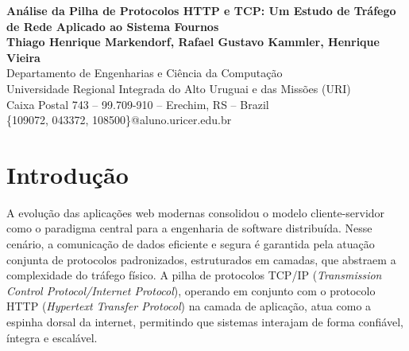 \documentclass[12pt, a4paper]{article}
\begin{document}
\begin{center}
  {\large\textbf{Análise da Pilha de Protocolos HTTP e TCP: Um Estudo de Tráfego de Rede Aplicado ao Sistema Fournos}}\\[0.5em]
  \textbf{Thiago Henrique Markendorf, Rafael Gustavo Kammler, Henrique Vieira}\\[0.3em]
  Departamento de Engenharias e Ciência da Computação\\
  Universidade Regional Integrada do Alto Uruguai e das Missões (URI)\\
  Caixa Postal 743 -- 99.709-910 -- Erechim, RS -- Brazil\\
  \{109072, 043372, 108500\}@aluno.uricer.edu.br
\end{center}

\vspace{1em}
\begin{abstract}
    Este artigo apresenta um estudo técnico sobre a comunicação de dados e o tráfego de rede aplicado ao projeto integrador Fournos, um sistema web de gerenciamento de pedidos para panificadoras. O objetivo principal do relatório é mapear o fluxo de informações através da pilha de protocolos TCP/IP, conectando conceitos teóricos da disciplina de redes de computadores à prática da engenharia de software. A análise abrange a atuação da Camada de Transporte, destacando o mecanismo de confiabilidade do protocolo TCP, e detalha a Camada de Aplicação, evidenciando o uso dos métodos HTTP e cabeçalhos para o tráfego de regras de negócio e controle de acesso (RBAC). Adicionalmente, o estudo explora o isolamento lógico provido por redes virtuais conteinerizadas (Docker) para a comunicação interna com o banco de dados PostgreSQL. Por fim, o trabalho propõe uma reflexão sobre eficiência de rede, comparando o alto custo de tráfego do atual modelo de \textit{HTTP Polling} com uma futura migração para o protocolo WebSocket. Conclui-se demonstrando a dependência intrínseca das aplicações \textit{full-stack} em relação aos protocolos de comunicação, evidenciando que a compreensão da infraestrutura de redes é fundamental para a viabilidade e evolução contínua do \textit{software}.
\end{abstract}

\section{Introdução}

A evolução das aplicações web modernas consolidou o modelo cliente-servidor como o paradigma central para a engenharia de software distribuída. Nesse cenário, a comunicação de dados eficiente e segura é garantida pela atuação conjunta de protocolos padronizados, estruturados em camadas, que abstraem a complexidade do tráfego físico. A pilha de protocolos TCP/IP (\textit{Transmission Control Protocol/Internet Protocol}), operando em conjunto com o protocolo HTTP (\textit{Hypertext Transfer Protocol}) na camada de aplicação, atua como a espinha dorsal da internet, permitindo que sistemas interajam de forma confiável, íntegra e escalável.
\end{document}
